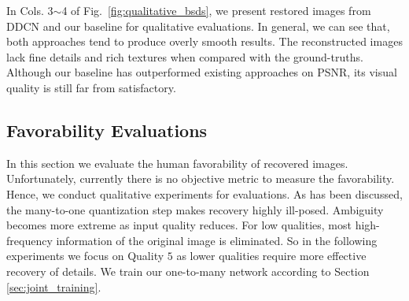\documentclass[10pt,twocolumn,letterpaper]{article}
\begin{document}
\begin{figure*}[t]
\centering
\captionsetup[subfloat]{labelformat=empty}
\hfil
{}
\hfil
{}
\hfil
{}
\hfil
{}
\vspace{-1em}
\hfil
{}
\hfil
{}
\hfil
{}
\hfil
{}
\vspace{-1em}
\caption{Comparisons under Quality $5$ on BSDS500. Row 1: Image 6046; Row 2: Image 344010. Best view on screen.}
\label{fig:qualitative_bsds}
\vspace{-1.5em}
\end{figure*}

In Cols. 3$\sim$4 of Fig.~\ref{fig:qualitative_bsds}, we present restored images from DDCN and our baseline for qualitative evaluations. In general, we can see that, both approaches tend to produce overly smooth results. The reconstructed images lack fine details and rich textures when compared with the ground-truths. Although our baseline has outperformed existing approaches on PSNR, its visual quality is still far from satisfactory.

\subsection{Favorability Evaluations}
In this section we evaluate the human favorability of recovered images. Unfortunately, currently there is no objective metric to measure the favorability. Hence, we conduct qualitative experiments for evaluations. As has been discussed, the many-to-one quantization step makes recovery highly ill-posed. Ambiguity becomes more extreme as input quality reduces. For low qualities, most high-frequency information of the original image is eliminated. So in the following experiments we focus on Quality $5$ as lower qualities require more effective recovery of details. We train our one-to-many network according to Section \ref{sec:joint_training}. 
\end{document}
